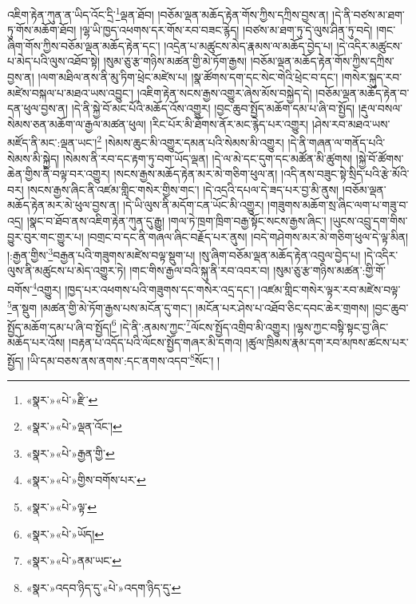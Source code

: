 འཇིག་རྟེན་ཀུན་ན་ཡིད་འོང་དྲི་\footnote{«སྣར་»«པེ་»རྫི་}ལྡན་ཐོབ། །བཅོམ་ལྡན་མཆོད་རྟེན་གོས་ཀྱིས་དཀྲིས་བྱས་ན། །དེ་ནི་བཙས་མ་ཐག་ཏུ་གོས་མཆོག་ཐོབ། །ལྷ་ཡི་ཁྱད་འཕགས་དར་གོས་རབ་བཟང་རྙེད། །བཙས་མ་ཐག་ཏུ་དེ་ལུས་ཤིན་ཏུ་བདེ། །གང་ཞིག་གོས་ཀྱིས་བཅོམ་ལྡན་མཆོད་རྟེན་དང་། །འདྲེན་པ་མཚུངས་མེད་རྣམས་ལ་མཆོད་བྱེད་པ། །དེ་འདིར་མཚུངས་པ་མེད་པའི་ལུས་འཐོབ་སྟེ། །སུམ་ཅུ་རྩ་གཉིས་མཚན་གྱི་མེ་ཏོག་རྒྱས། །བཅོམ་ལྡན་མཆོད་རྟེན་གོས་ཀྱིས་དཀྲིས་བྱས་ན། །ལག་མཐིལ་ནས་ནི་མུ་ཏིག་ཕྲེང་མཛེས་པ། །སྣ་ཚོགས་དག་དང་སེང་གེའི་ཕྲེང་བ་དང་། །གསེར་སྐུད་རབ་མཛེས་བསྐལ་པ་མཐའ་ཡས་འབྱུང་། །འཇིག་རྟེན་སངས་རྒྱས་འགྱུར་ཞེས་མོས་བསྐྱེད་དེ། །བཅོམ་ལྡན་མཆོད་རྟེན་བ་དན་ཕུལ་བྱས་ན། །དེ་ནི་སྐྱེ་བོ་མང་པོའི་མཆོད་འོས་འགྱུར། །བྱང་ཆུབ་སྤྱོད་མཆོག་དམ་པ་ཞི་བ་སྤྱོད། །རྡུལ་བསལ་སེམས་ཅན་མཆོག་ལ་རྒྱལ་མཚན་ཕུལ། །རིང་པོར་མི་ཐོགས་ནོར་མང་རྙེད་པར་འགྱུར། །ཤེས་རབ་མཐའ་ཡས་མཛོད་ནི་མང་:ལྡན་ཡང་།\footnote{«སྣར་»«པེ་»ལྡན་འོང་།} །སེམས་ཆུང་མི་འགྱུར་དམན་པའི་སེམས་མི་འགྱུར། །དེ་ནི་གཞན་ལ་གནོད་པའི་སེམས་མི་སྐྱེད། །སེམས་ནི་རབ་དང་རྟག་ཏུ་བག་ཡོད་ལྡན། །དེ་ལ་མེ་དང་དུག་དང་མཚོན་མི་ཚུགས། །སྐྱེ་བོ་ཚོགས་ཆེན་གྱིས་ནི་བལྟ་བར་འགྱུར། །སངས་རྒྱས་མཆོད་རྟེན་མར་མེ་གཅིག་ཕུལ་ན། །འདི་ནས་བཟུང་སྟེ་སྲིད་པའི་རྩེ་མོའི་བར། །སངས་རྒྱས་ཞིང་ནི་འཛམ་གླིང་གསེར་གྱིས་གང་། །དེ་འདྲའི་དཔལ་དེ་ཟད་པར་བྱ་མི་ནུས། །བཅོམ་ལྡན་མཆོད་རྟེན་མར་མེ་ཕུལ་བྱས་ན། །དེ་ཡི་ལུས་ནི་མདོག་ངན་ཡོང་མི་འགྱུར། །གཟུགས་མཆོག་སྲ་ཞིང་ལག་པ་གཟུ་བ་འདྲ། །སྣང་བ་ཐོབ་ནས་འཇིག་རྟེན་ཀུན་དུ་རྒྱུ། །གལ་ཏེ་ཁྲག་ཁྲིག་བརྒྱ་སྟོང་སངས་རྒྱས་ཞིང་། །ཡུངས་འབྲུ་དག་གིས་བྱུར་བུར་གང་གྱུར་པ། །བགྲང་བ་དང་ནི་གཞལ་ཞིང་བརྗོད་པར་ནུས། །བདེ་གཤེགས་མར་མེ་གཅིག་ཕུལ་དེ་ལྟ་མིན། །:རྒྱན་གྱིས་\footnote{«སྣར་»«པེ་»རྒྱན་གྱི་}བརྒྱན་པའི་གཟུགས་མཛེས་བལྟ་སྡུག་པ། །སུ་ཞིག་བཅོམ་ལྡན་མཆོད་རྟེན་འབུལ་བྱེད་པ། །དེ་འདིར་ལུས་ནི་མཚུངས་པ་མེད་འགྱུར་ཏེ། །གང་གིས་རྒྱལ་བའི་སྐུ་ནི་རབ་འབར་བ། །སུམ་ཅུ་རྩ་གཉིས་མཚན་:གྱི་གོ་བགོས་\footnote{«སྣར་»«པེ་»གྱིས་བགོས་པར་}འགྱུར། །ཁྱད་པར་འཕགས་པའི་གཟུགས་དང་གསེར་འདྲ་དང་། །འཛམ་གླིང་གསེར་ལྟར་རབ་མཛེས་བལྟ་\footnote{«སྣར་»«པེ་»ལྟ་}ན་སྡུག །མཚན་གྱི་མེ་ཏོག་རྒྱས་པས་མངོན་དུ་གང་། །མངོན་པར་ཤེས་པ་འཐོབ་ཅིང་དབང་ཆེར་གྲགས། །བྱང་ཆུབ་སྤྱོད་མཆོག་དམ་པ་ཞི་བ་སྤྱོད།\footnote{«སྣར་»«པེ་»ཡོད།} །དེ་ནི་:ནམས་ཀྱང་\footnote{«སྣར་»«པེ་»ནམ་ཡང་}ལོངས་སྤྱོད་འགྲིབ་མི་འགྱུར། །ལྷས་ཀྱང་བསྟི་སྟང་བྱ་ཞིང་མཆོད་པར་འོས། །བརྟན་པ་འདོད་པའི་ལོངས་སྤྱོད་གཞར་མི་དགའ། །ཚུལ་ཁྲིམས་རྣམ་དག་རབ་མཁས་ཚངས་པར་སྤྱོད། །ཡི་དམ་བཅས་ནས་ནགས་:དང་ནགས་འདབ་\footnote{«སྣར་»འདབ་ཉིད་དུ་«པེ་»འདག་ཉིད་དུ་}སོང་། །
